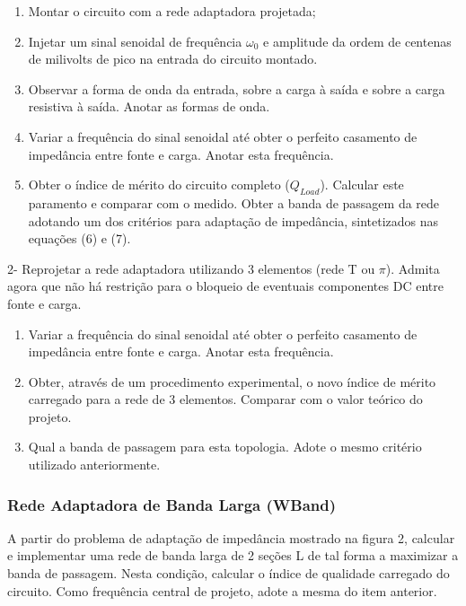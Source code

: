 \begin{enumerate}[label=\alph*]
    \item Montar o circuito com a rede adaptadora projetada;
    
    \item Injetar um sinal senoidal de frequência $\omega_0$ e
    amplitude da ordem de centenas de milivolts de pico na entrada do circuito montado.
    
    \item Observar a forma de onda da entrada, sobre a carga à saída e sobre a carga resistiva à saída. Anotar as formas de onda.
    
    \item Variar a frequência do sinal senoidal até obter o perfeito casamento de impedância entre fonte e carga. Anotar esta frequência.
    
    \item Obter o índice de mérito do circuito completo ($Q_{Load}$). Calcular este paramento e comparar com o medido. Obter a banda de passagem da rede adotando um dos critérios para adaptação de impedância, sintetizados nas equações (6) e (7).
   \end{enumerate} 

2- Reprojetar a rede adaptadora utilizando 3 elementos (rede T ou $\pi$). Admita agora que não há restrição para o bloqueio de eventuais componentes
DC entre fonte e carga.
\begin{enumerate}[label=\alph*]
    \item Variar a frequência do sinal senoidal até obter o perfeito casamento de impedância entre fonte e carga. Anotar esta frequência.
    
    \item  Obter, através de um procedimento experimental, o novo índice de mérito carregado para a rede de 3 elementos. Comparar com o valor teórico do projeto.
    
    \item Qual a banda de passagem para esta topologia. Adote o mesmo critério utilizado anteriormente.
\end{enumerate}


\subsubsection{Rede Adaptadora de Banda Larga (WBand)}

A partir do problema de adaptação de impedância mostrado na figura 2, calcular e implementar uma rede de banda larga de 2 seções L de tal forma a maximizar a banda de passagem. Nesta condição, calcular o índice de qualidade carregado do circuito. Como frequência central de projeto, adote a mesma do item anterior.

